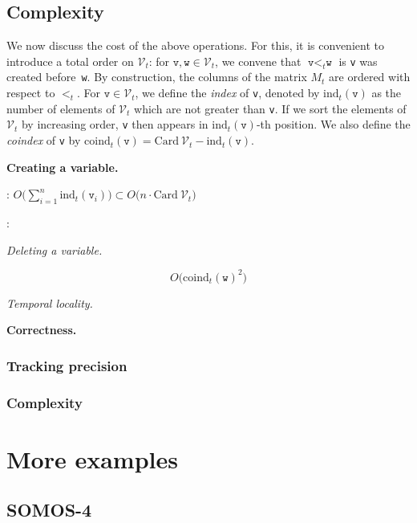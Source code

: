 \documentclass[sigconf]{acmart}
\newcommand{\calV}{\mathcal{V}}
\newcommand{\ttv}{\texttt{v}\xspace}
\newcommand{\ttw}{\texttt{w}\xspace}
\newcommand{\ZpLC}{\text{\rm \tt ZpLC}\xspace}
\newcommand{\ZpLF}{\text{\rm \tt ZpLF}\xspace}
\newcommand{\card}{\text{Card}\:}
\newcommand{\ind}{\text{ind}}
\newcommand{\coind}{\text{coind}}
\theoremstyle{definition}
\begin{document}
\subsection{Complexity}

We now discuss the cost of the above operations.
For this,
it is convenient to introduce a total order on $\calV_t$: for $\ttv, 
\ttw \in \calV_t$, we convene that $\ttv <_t \ttw$ is \ttv was created 
before~\ttw. By construction, the columns of the matrix $M_t$ are 
ordered with respect to $<_t$.
For $\ttv \in \calV_t$, we define the \emph{index} of \ttv, denoted by 
$\ind_t(\ttv)$ as the number of elements of $\calV_t$ which are not 
greater than \ttv. If we sort the elements of $\calV_t$ by increasing 
order, \ttv then appears in $\ind_t(\ttv)$-th position.
We also define the \emph{coindex} of \ttv by
$\coind_t(\ttv) = \card \calV_t - \ind_t(\ttv)$.

\medskip

\noindent \textbf{Creating a variable.}

\ZpLC: $O\bigg(\sum_{i=1}^n \ind_t(\ttv_i)\bigg) \subset 
O\big(n \cdot \card \calV_t\big)$

\ZpLF: 

\medskip

\noindent \textit{Deleting a variable.}

$$O\big(\coind_t(\ttw)^2\big)$$

\medskip

\noindent \textit{Temporal locality.}

\medskip

\noindent \textbf{Correctness.}

\subsubsection*{Tracking precision}

\subsubsection*{Complexity}

\section{More examples}

\subsection{SOMOS-4}
\end{document}
